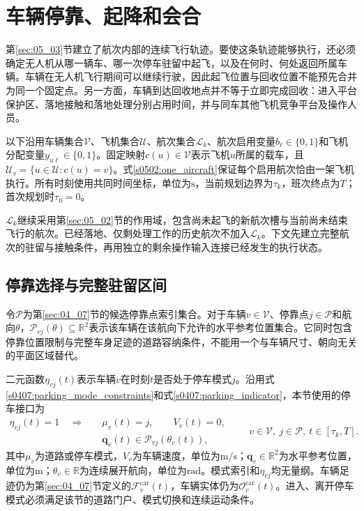 \section{车辆停靠、起降和会合}
\label{sec:05_04}

第\ref{sec:05_03}节建立了航次内部的连续飞行轨迹。要使这条轨迹能够执行，还必须确定无人机从哪一辆车、哪一次停车驻留中起飞，以及在何时、何处返回所属车辆。车辆在无人机飞行期间可以继续行驶，因此起飞位置与回收位置不能预先合并为同一个固定点。另一方面，车辆到达回收地点并不等于立即完成回收：进入平台保护区、落地接触和落地处理分别占用时间，并与同车其他飞机竞争平台及操作人员。

以下沿用车辆集合$\mathcal V$、飞机集合$\mathcal U$、航次集合$\mathcal L_k$、航次启用变量$b_\ell\in\{0,1\}$和飞机分配变量$y_{u\ell}\in\{0,1\}$。固定映射$c(u)\in\mathcal V$表示飞机$u$所属的载车，且$\mathcal U_v=\{u\in\mathcal U:c(u)=v\}$。式\eqref{s0502:one_aircraft}保证每个启用航次恰由一架飞机执行。所有时刻使用共同时间坐标，单位为$\mathrm{s}$，当前规划边界为$\tau_k$，班次终点为$T$；首次规划时$\tau_0=0$。

$\mathcal L_k$继续采用第\ref{sec:05_02}节的作用域，包含尚未起飞的新航次槽与当前尚未结束飞行的航次。已经落地、仅剩处理工作的历史航次不加入$\mathcal L_k$。下文先建立完整航次的驻留与接触条件，再用独立的剩余操作输入连接已经发生的执行状态。

\subsection{停靠选择与完整驻留区间}

令$\mathcal P$为第\ref{sec:04_07}节的候选停靠点索引集合。对于车辆$v\in\mathcal V$、停靠点$j\in\mathcal P$和航向$\theta$，$\mathcal P_{vj}(\theta)\subseteq\mathbb R^2$表示该车辆在该航向下允许的水平参考位置集合。它同时包含停靠位置限制与完整车身足迹的道路容纳条件，不能用一个与车辆尺寸、朝向无关的平面区域替代。

二元函数$\eta_{vj}(t)$表示车辆$v$在时刻$t$是否处于停车模式$j$。沿用式\eqref{s0407:parking_mode_constraints}和式\eqref{s0407:parking_indicator}，本节使用的停车接口为
\begin{equation}
 \begin{aligned}
 \eta_{vj}(t)=1\quad\Longrightarrow\quad
 &\mu_v(t)=j,\qquad V_v(t)=0,\\
 &\mathbf q_v(t)\in\mathcal P_{vj}(\theta_v(t)),
 \end{aligned}
 \qquad v\in\mathcal V,\ j\in\mathcal P,\ t\in[\tau_k,T].
 \label{s0504:parking_interface}
\end{equation}
其中$\mu_v$为道路或停车模式，$V_v$为车辆速度，单位为$\mathrm{m/s}$；$\mathbf q_v\in\mathbb R^2$为水平参考位置，单位为$\mathrm m$；$\theta_v\in\mathbb R$为连续展开航向，单位为$\mathrm{rad}$。模式索引和$\eta_{vj}$均无量纲。车辆足迹仍为第\ref{sec:04_07}节定义的$\mathcal F_v^{\mathrm{car}}(t)$，车辆实体仍为$\mathcal O_v^{\mathrm{car}}(t)$。进入、离开停车模式必须满足该节的道路门户、模式切换和连续运动条件。

